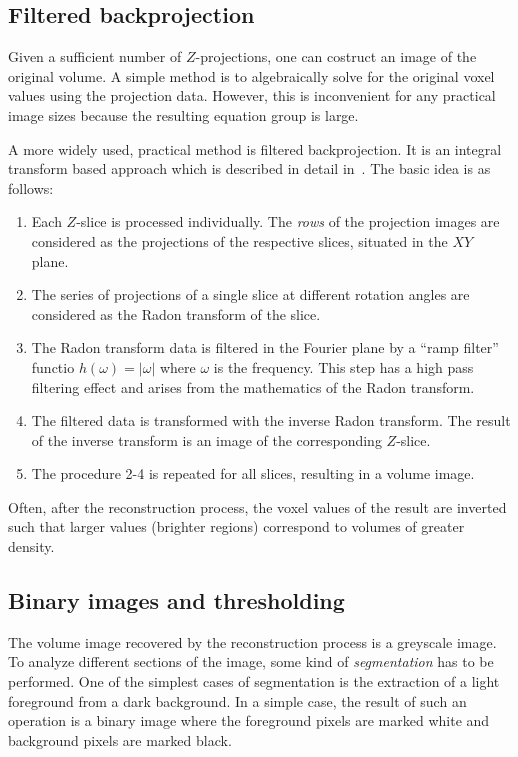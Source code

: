 \documentclass[a4paper,twoside,12pt]{article}
\begin{document}
\subsection{Filtered backprojection}
Given a sufficient number of $Z$-projections, one can costruct an image of the original volume. A simple method is to algebraically solve for the original voxel values using the projection data. However, this is inconvenient for any practical image sizes because the resulting equation group is large.

A more widely used, practical method is filtered backprojection. It is an integral transform based approach which is described in detail in~\cite{radon}. The basic idea is as follows:
\begin{enumerate}
    \item Each $Z$-slice is processed individually. The \emph{rows} of the projection images are considered as the projections of the respective slices, situated in the $XY$ plane.

    \item The series of projections of a single slice at different rotation angles are considered as the Radon transform of the slice.

    \item The Radon transform data is filtered in the Fourier plane by a ``ramp filter'' functio $h(\omega) = |\omega|$ where $\omega$ is the frequency. This step has a high pass filtering effect and arises from the mathematics of the Radon transform.

    \item The filtered data is transformed with the inverse Radon transform. The result of the inverse transform is an image of the corresponding $Z$-slice.

    \item The procedure 2-4 is repeated for all slices, resulting in a volume image.
\end{enumerate}

Often, after the reconstruction process, the voxel values of the result are inverted such that larger values (brighter regions) correspond to volumes of greater density.

\subsection{Binary images and thresholding}
\label{sec:thresholding}
The volume image recovered by the reconstruction process is a greyscale image. To analyze different sections of the image, some kind of \emph{segmentation} has to be performed. One of the simplest cases of segmentation is the extraction of a light foreground from a dark background. In a simple case, the result of such an operation is a binary image where the foreground pixels are marked white and background pixels are marked black.
\end{document}
